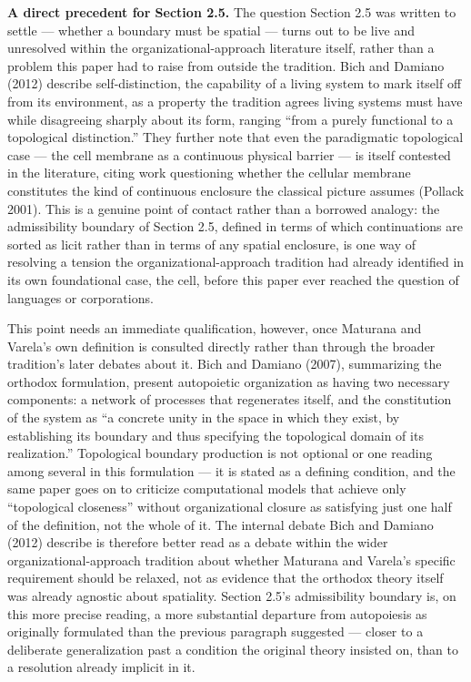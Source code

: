 \documentclass[11pt]{article}
\theoremstyle{plain}
\begin{document}
\textbf{A direct precedent for Section 2.5.} The question Section 2.5 was written to settle --- whether a boundary must be spatial --- turns out to be live and unresolved within the organizational-approach literature itself, rather than a problem this paper had to raise from outside the tradition. Bich and Damiano (2012) describe self-distinction, the capability of a living system to mark itself off from its environment, as a property the tradition agrees living systems must have while disagreeing sharply about its form, ranging ``from a purely functional to a topological distinction.'' They further note that even the paradigmatic topological case --- the cell membrane as a continuous physical barrier --- is itself contested in the literature, citing work questioning whether the cellular membrane constitutes the kind of continuous enclosure the classical picture assumes (Pollack 2001). This is a genuine point of contact rather than a borrowed analogy: the admissibility boundary of Section 2.5, defined in terms of which continuations are sorted as licit rather than in terms of any spatial enclosure, is one way of resolving a tension the organizational-approach tradition had already identified in its own foundational case, the cell, before this paper ever reached the question of languages or corporations.

This point needs an immediate qualification, however, once Maturana and Varela's own definition is consulted directly rather than through the broader tradition's later debates about it. Bich and Damiano (2007), summarizing the orthodox formulation, present autopoietic organization as having two necessary components: a network of processes that regenerates itself, and the constitution of the system as ``a concrete unity in the space in which they exist, by establishing its boundary and thus specifying the topological domain of its realization.'' Topological boundary production is not optional or one reading among several in this formulation --- it is stated as a defining condition, and the same paper goes on to criticize computational models that achieve only ``topological closeness'' without organizational closure as satisfying just one half of the definition, not the whole of it. The internal debate Bich and Damiano (2012) describe is therefore better read as a debate within the wider organizational-approach tradition about whether Maturana and Varela's specific requirement should be relaxed, not as evidence that the orthodox theory itself was already agnostic about spatiality. Section 2.5's admissibility boundary is, on this more precise reading, a more substantial departure from autopoiesis as originally formulated than the previous paragraph suggested --- closer to a deliberate generalization past a condition the original theory insisted on, than to a resolution already implicit in it.
\end{document}
